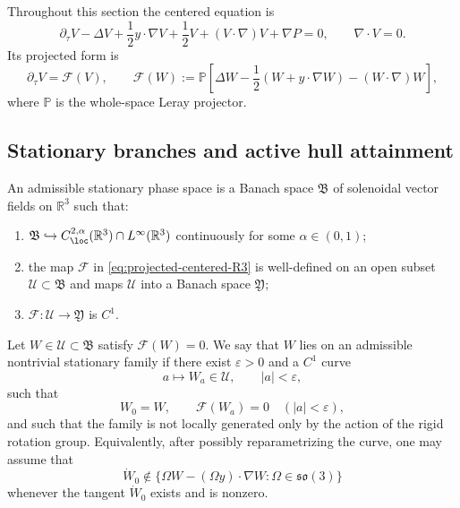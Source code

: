 Throughout this section the centered equation is
\begin{equation}\label{eq:centered-R3}
   \partial_\tau V-\Delta V+\frac12 y\cdot\nabla V+\frac12 V
   +(V\cdot\nabla)V+\nabla P=0,
   \qquad \nabla\cdot V=0 .
\end{equation}
Its projected form is
\begin{equation}\label{eq:projected-centered-R3}
   \partial_\tau V=\mathcal F(V),
   \qquad
   \mathcal F(W)
   :=
   \mathbb P\left[
      \Delta W-\frac12(W+y\cdot\nabla W)-(W\cdot\nabla)W
   \right],
\end{equation}
where \(\mathbb P\) is the whole-space Leray projector.

\subsection{Stationary branches and active hull attainment}

\begin{definition}
\label{def:R3-stationary-phase-space}
An admissible stationary phase space is a Banach space \(\mathfrak B\) of
solenoidal vector fields on \(\mathbb R^3\) such that:
\begin{enumerate}[label=(\roman*)]
   \item \(\mathfrak B\hookrightarrow C^{2,\alpha}_{\loc}(\mathbb R^3)
      \cap L^\infty(\mathbb R^3)\) continuously for some
      \(\alpha\in(0,1)\);
   \item the map \(\mathcal F\) in \eqref{eq:projected-centered-R3} is
      well-defined on an open subset \(\mathcal U\subset\mathfrak B\) and maps
      \(\mathcal U\) into a Banach space \(\mathfrak Y\);
   \item \(\mathcal F:\mathcal U\to\mathfrak Y\) is \(C^1\).
\end{enumerate}
\end{definition}

\begin{definition}
\label{def:R3-stationary-family}
Let \(W\in\mathcal U\subset\mathfrak B\) satisfy \(\mathcal F(W)=0\).  We say
that \(W\) lies on an admissible nontrivial stationary family if there exist
\(\varepsilon>0\) and a \(C^1\) curve
\[
   a\mapsto W_a\in\mathcal U,
   \qquad |a|<\varepsilon,
\]
such that
\begin{equation}\label{eq:R3-stationary-family}
   W_0=W,
   \qquad
   \mathcal F(W_a)=0 \quad (|a|<\varepsilon),
\end{equation}
and such that the family is not locally generated only by the action of the
rigid rotation group.  Equivalently, after possibly reparametrizing the curve,
one may assume that
\begin{equation}\label{eq:R3-nontrivial-tangent}
   \dot W_0\notin
   \{\Omega W-(\Omega y)\cdot\nabla W:\Omega\in\mathfrak{so}(3)\}
\end{equation}
whenever the tangent \(\dot W_0\) exists and is nonzero.
\end{definition}

